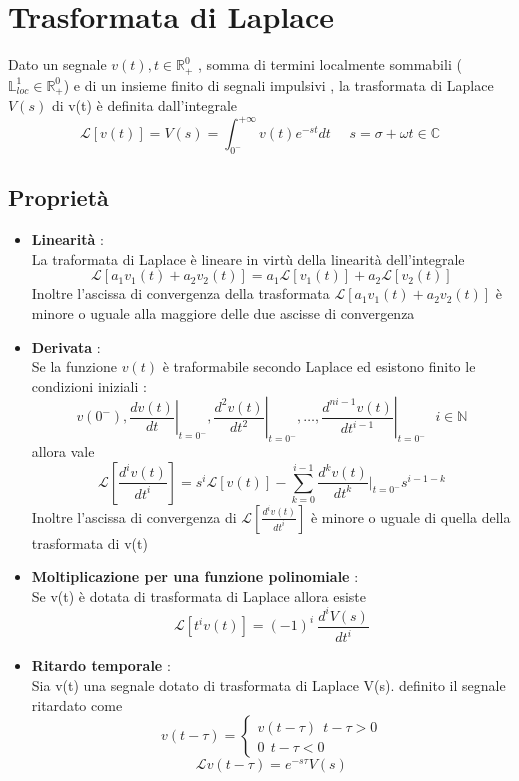 \documentclass{article}
\theoremstyle{definition}
\newcommand{\R}{\mathbb{R}}
\begin{document}
	\section{Trasformata di Laplace}
	Dato un segnale $v(t) , t \in \R_+^0$ , somma di termini localmente sommabili ($\mathbb{L}_{loc}^1 \in \R_+^0$) e di un insieme finito di segnali impulsivi , la trasformata di Laplace $V(s)$ di v(t) è definita dall'integrale 
	$$\mathcal{L}[v(t)]=V(s)=\int_{0^-}^{+\infty}v(t) e^{-st}dt \ \ \ \ \ \ s=\sigma + \omega t \in \mathbb{C}$$
	\subsection{Proprietà}
	\begin{itemize}
		\item \textbf{Linearità} : \\ La traformata di Laplace è lineare in virtù della linearità dell'integrale 
		$$\mathcal{L}[a_1v_1(t)+a_2v_2(t)]=a_1\mathcal{L}[v_1(t)]+a_2\mathcal{L}[v_2(t)]$$
		Inoltre l'ascissa di convergenza della trasformata $\mathcal{L}[a_1v_1(t)+a_2v_2(t)]$ è minore o uguale alla maggiore delle due ascisse di convergenza 
		\item \textbf{Derivata} : \\
		Se la funzione $v(t)$ è traformabile secondo Laplace  ed esistono finito le condizioni iniziali :  $$v\left(0^{-}\right),\left.\frac{d v(t)}{d t}\right|_{t=0^{-}},\left.\frac{d^2 v(t)}{d t^2}\right|_{t=0^{-}}, \ldots,\left.\frac{d^{ni-1} v(t)}{d t^{i-1}}\right|_{t=0^{-}} \ \ \ i \in \mathbb{N}
		$$  allora vale 
		$$\mathcal{L}\left[\frac{d^iv(t)}{dt^i}\right]=s^i \mathcal{L}[v(t)] - \sum_{k=0}^{i-1}\frac{d^kv(t)}{dt^k} \big|_{t=0^-} s^{i-1-k}$$
		Inoltre l'ascissa di convergenza di $\mathcal{L}\left[\frac{d^iv(t)}{dt^i}\right]$ è minore o uguale di quella della trasformata di v(t)
	\item \textbf{Moltiplicazione per una funzione polinomiale} : \\ 
	Se v(t) è dotata di trasformata di Laplace allora esiste 
	$$\mathcal{L}[t^i v(t)]=(-1)^i\  \frac{d^iV(s)}{dt^i}$$
	\item \textbf{Ritardo temporale }: \\
	Sia v(t) una segnale dotato di trasformata di Laplace V(s). definito il segnale ritardato come 
	$$v(t-\tau)=\begin{cases}
	v(t-\tau)\ \  t-\tau>0\\
	0 \ \ t-\tau < 0
	\end{cases}$$
	$$\mathcal{L}{v(t-\tau)}=e^{-s\tau}V(s)$$

\end{itemize}
\end{document}
